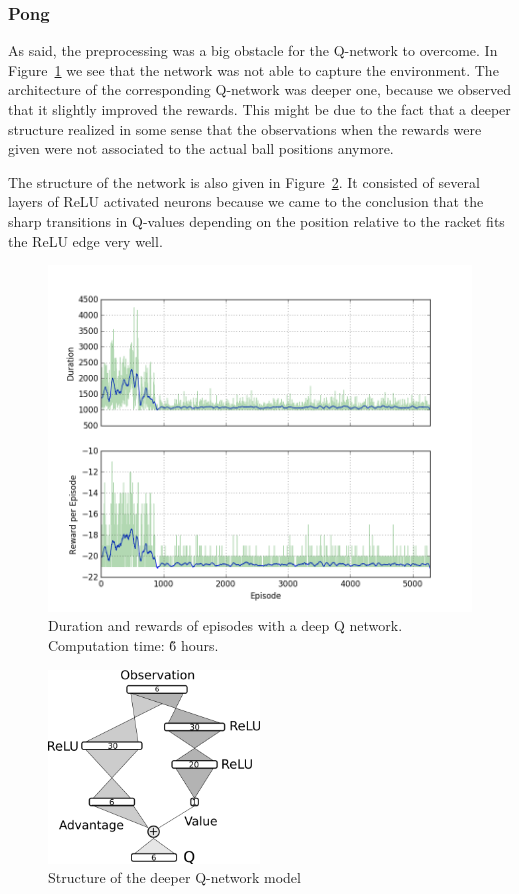 \documentclass[10pt,a4paper]{article}
\begin{document}
\FloatBarrier
\subsubsection{Pong}
As said, the preprocessing was a big obstacle for the Q-network to overcome. In Figure~\ref{fig:deepq_pong_duration} we see that the network was not able to capture the environment. The architecture of the corresponding Q-network was deeper one, because we observed that it slightly improved the rewards. This might be due to the fact that a deeper structure realized in some sense that the observations when the rewards were given were not associated to the actual ball positions anymore.

The structure of the network is also given in Figure~\ref{fig:deepq_relu_structure}. It consisted of several layers of ReLU activated neurons because we came to the conclusion that the sharp transitions in Q-values depending on the position relative to the racket fits the ReLU edge very well.

\begin{figure}[!ht]
  \centering
  \includegraphics[width=1\textwidth]{./figures/long_trial.png}
  \caption{Duration and rewards of episodes with a deep Q network. Computation time: \~6 hours.}
  \label{fig:deepq_pong_duration}
\end{figure}

\begin{figure}[!ht]
  \centering
  \includegraphics[width=0.5\textwidth]{./figures/deep_relu.png}
  \caption{Structure of the deeper Q-network model}
  \label{fig:deepq_relu_structure}
\end{figure}
\end{document}
